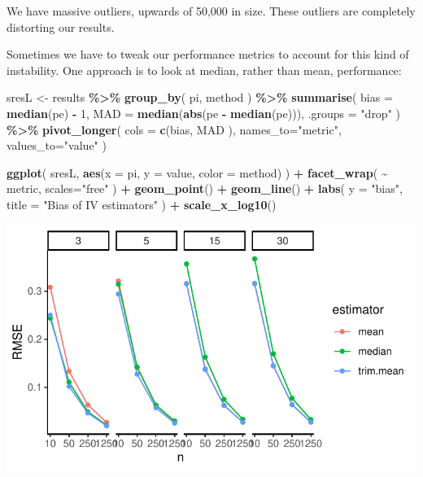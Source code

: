 \documentclass[
]{book}
\newenvironment{Shaded}{\begin{snugshade}}{\end{snugshade}}
\newcommand{\AttributeTok}[1]{\textcolor[rgb]{0.13,0.29,0.53}{#1}}
\newcommand{\DecValTok}[1]{\textcolor[rgb]{0.00,0.00,0.81}{#1}}
\newcommand{\FunctionTok}[1]{\textcolor[rgb]{0.13,0.29,0.53}{\textbf{#1}}}
\newcommand{\NormalTok}[1]{#1}
\newcommand{\OtherTok}[1]{\textcolor[rgb]{0.56,0.35,0.01}{#1}}
\newcommand{\SpecialCharTok}[1]{\textcolor[rgb]{0.81,0.36,0.00}{\textbf{#1}}}
\newcommand{\StringTok}[1]{\textcolor[rgb]{0.31,0.60,0.02}{#1}}
\begin{document}
We have massive outliers, upwards of 50,000 in size.
These outliers are completely distorting our results.

Sometimes we have to tweak our performance metrics to account for this kind of instability.
One approach is to look at median, rather than mean, performance:

\begin{Shaded}
\begin{Highlighting}[]
\NormalTok{sresL }\OtherTok{\textless{}{-}}\NormalTok{ results }\SpecialCharTok{\%\textgreater{}\%}
  \FunctionTok{group\_by}\NormalTok{( pi, method ) }\SpecialCharTok{\%\textgreater{}\%}
  \FunctionTok{summarise}\NormalTok{( }
    \AttributeTok{bias =} \FunctionTok{median}\NormalTok{(pe) }\SpecialCharTok{{-}} \DecValTok{1}\NormalTok{,}
    \AttributeTok{MAD =} \FunctionTok{median}\NormalTok{(}\FunctionTok{abs}\NormalTok{(pe }\SpecialCharTok{{-}} \FunctionTok{median}\NormalTok{(pe))), }\AttributeTok{.groups =} \StringTok{"drop"}\NormalTok{ ) }\SpecialCharTok{\%\textgreater{}\%}
  \FunctionTok{pivot\_longer}\NormalTok{(}
    \AttributeTok{cols =} \FunctionTok{c}\NormalTok{(bias, MAD ),}
    \AttributeTok{names\_to=}\StringTok{"metric"}\NormalTok{,}
    \AttributeTok{values\_to=}\StringTok{"value"}\NormalTok{ )}

\FunctionTok{ggplot}\NormalTok{( sresL, }\FunctionTok{aes}\NormalTok{(}\AttributeTok{x =}\NormalTok{ pi, }\AttributeTok{y =}\NormalTok{ value, }\AttributeTok{color =}\NormalTok{ method) ) }\SpecialCharTok{+}
  \FunctionTok{facet\_wrap}\NormalTok{( }\SpecialCharTok{\textasciitilde{}}\NormalTok{ metric, }\AttributeTok{scales=}\StringTok{"free"}\NormalTok{ ) }\SpecialCharTok{+}
  \FunctionTok{geom\_point}\NormalTok{() }\SpecialCharTok{+} \FunctionTok{geom\_line}\NormalTok{() }\SpecialCharTok{+}
  \FunctionTok{labs}\NormalTok{( }\AttributeTok{y =} \StringTok{"bias"}\NormalTok{, }\AttributeTok{title =} \StringTok{"Bias of IV estimators"}\NormalTok{ ) }\SpecialCharTok{+}
  \FunctionTok{scale\_x\_log10}\NormalTok{()}
\end{Highlighting}
\end{Shaded}

\begin{center}\includegraphics[width=0.75\linewidth]{Designing-Simulations-in-R_files/figure-latex/unnamed-chunk-176-1} \end{center}
\end{document}
